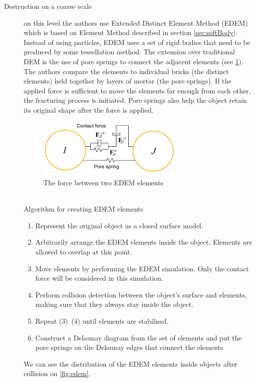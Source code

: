 \begin{description}
\item[Destruction on a coarse scale] on this level the authors use Extended Distinct Element Method (EDEM) which is based on Element Method described in section \ref{sec:softBody}. Instead of using particles, EDEM uses a set of rigid bodies that need to be produced by some tessellation method. The extension over traditional DEM is the use of pore springs to connect the adjacent elements (see \cref{fig:spring}). The authors compare the elements to individual bricks (the distinct elements) held together by layers of mortar (the pore springs). If the applied force is sufficient to move the elements far enough from each other, the fracturing process is initiated. Pore springs also help the object retain its original shape after the force is applied. 
\begin{figure}[t]
        \centering
        \includegraphics[width=0.7\textwidth]{img/spring}
        \caption{The force between two EDEM elements \cite{edem}}
        \label{fig:spring}
\end{figure}
\\Algorithm for creating EDEM elements
\begin{enumerate}
\item Represent the original object as a closed surface model.
\item Arbitrarily arrange the EDEM elements inside the object.
Elements are allowed to overlap at this point.
\item Move elements by performing the EDEM simulation. Only the contact force will be considered in this simulation.
\item Perform collision detection between the object’s surface
and elements, making sure that they always
stay inside the object.
\item Repeat (3)–(4) until elements are stabilised.
\item Construct a Delaunay diagram from the set of elements
and put the pore springs on the Delaunay edges that connect
the elements
\end{enumerate}
We can see the distribution of the EDEM elements inside objects after collision on \cref{fig:edem}.


\end{description}
